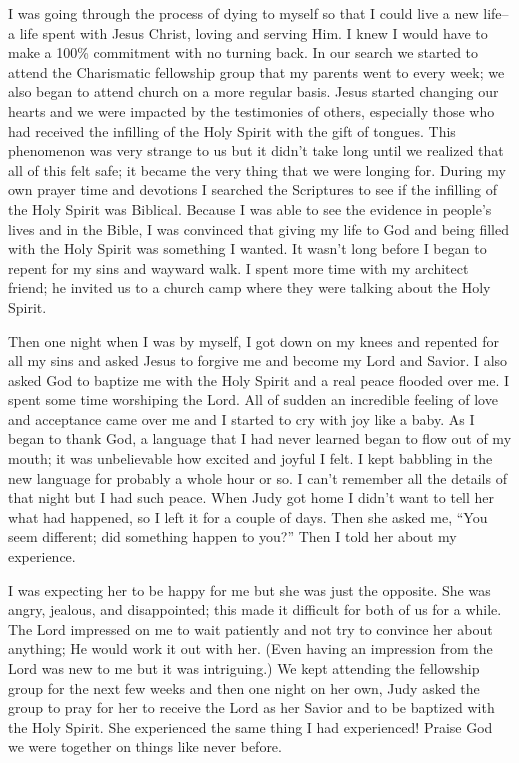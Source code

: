 \documentclass[twoside, 12pt]{book}
\begin{document}
I was going through the process of dying to myself so that I could live a new life--a life spent with Jesus Christ, loving and serving Him. I knew I would have to make a 100\% commitment with no turning back. In our search we started to attend the Charismatic fellowship group that my parents went to every week; we also began to attend church on a more regular basis. Jesus started changing our hearts and we were impacted by the testimonies of others, especially those who had received the infilling of the Holy Spirit with the gift of tongues. This phenomenon was very strange to us but it didn't take long until we realized that all of this felt safe; it became the very thing that we were longing for. During my own prayer time and devotions I searched the Scriptures to see if the infilling of the Holy Spirit was Biblical. Because I was able to see the evidence in people’s lives and in the Bible, I was convinced that giving my life to God and being filled with the Holy Spirit was something I wanted. It wasn’t long before I began to repent for my sins and wayward walk. I spent more time with my architect friend; he invited us to a church camp where they were talking about the Holy Spirit. 

Then one night when I was by myself, I got down on my knees and repented for all my sins and asked Jesus to forgive me and become my Lord and Savior. I also asked God to baptize me with the Holy Spirit and a real peace flooded over me. I spent some time worshiping the Lord. All of sudden an incredible feeling of love and acceptance came over me and I started to cry with joy like a baby. As I began to thank God, a language that I had never learned began to flow out of my mouth; it was unbelievable how excited and joyful I felt. I kept babbling in the new language for probably a whole hour or so. I can't remember all the details of that night but I had such peace. When Judy got home I didn't want to tell her what had happened, so I left it for a couple of days. Then she asked me, “You seem different; did something happen to you?” Then I told her about my experience. 

I was expecting her to be happy for me but she was just the opposite. She was angry, jealous, and disappointed; this made it difficult for both of us for a while. The Lord impressed on me to wait patiently and not try to convince her about anything; He would work it out with her. (Even having an impression from the Lord was new to me but it was intriguing.) We kept attending the fellowship group for the next few weeks and then one night on her own, Judy asked the group to pray for her to receive the Lord as her Savior and to be baptized with the Holy Spirit. She experienced the same thing I had experienced! Praise God we were together on things like never before. 
\end{document}

